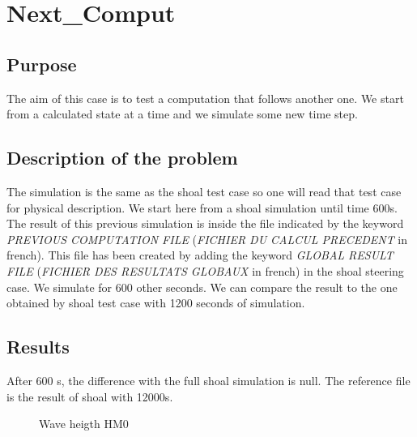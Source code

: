 \chapter{Next\_Comput}

\section{Purpose}
%
The aim of this case is to test a computation that follows another one. We start from a calculated state at a time and we simulate some new time step.
%
\section{Description of the problem}
%
The simulation is the same as the shoal test case so one will read that test case for physical description. We start here from a shoal simulation until time 600s. The result of this previous simulation is inside the file indicated by the keyword {\it PREVIOUS COMPUTATION FILE} ({\it FICHIER DU CALCUL PRECEDENT} in french). This file has been created by adding the keyword  {\it GLOBAL RESULT FILE} ({\it FICHIER DES RESULTATS GLOBAUX} in french) in the shoal steering case.
We simulate for 600 other seconds. We can compare the result to the one obtained by shoal test case with 1200 seconds of simulation.

\section{Results}
After 600 s, the difference with the full shoal simulation is null. The reference file is the result of shoal with 12000s.
\begin{figure} [!h]
\centering
{}
 \caption{Wave heigth HM0}
\label{resnextcomp}
\end{figure}
